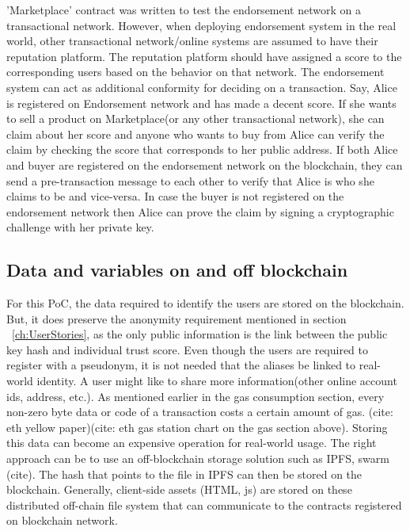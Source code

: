 'Marketplace' contract was written to test the endorsement network on a
transactional network. However, when deploying endorsement system in the real
world, other transactional network/online systems are assumed to have their
reputation platform. The reputation platform should have assigned a score to
the corresponding users based on the behavior on that network. The endorsement
system can act as additional conformity for deciding on a transaction. Say,
Alice is registered on Endorsement network and has made a decent score. If she
wants to sell a product on Marketplace(or any other transactional network), she
can claim about her score and anyone who wants to buy from Alice can verify the
claim by checking the score that corresponds to her public address. If both
Alice and buyer are registered on the endorsement network on the blockchain,
they can send a pre-transaction message to each other to verify that Alice is
who she claims to be and vice-versa. In case the buyer is not registered on the
endorsement network then Alice can prove the claim by signing a cryptographic
challenge with her private key. 

\subsection{Data and variables on and off blockchain}
For this PoC, the data required to identify the users are stored on the
blockchain. But, it does preserve the anonymity requirement mentioned in
section ~\ref{ch:UserStories}, as the only public information is the link between the public
key hash and individual trust score. Even though the users are required to
register with a pseudonym, it is not needed that the aliases be linked to
real-world identity. A user might like to share more information(other online
account ids, address, etc.).  As mentioned earlier in the gas consumption
section, every non-zero byte data or code of a transaction costs a certain
amount of gas. (cite: eth yellow paper)(cite: eth gas station chart on the gas
section above). Storing this data can become an expensive operation for
real-world usage. The right approach can be to use an off-blockchain storage
solution such as IPFS, swarm (cite). The hash that points to the file in IPFS
can then be stored on the blockchain. Generally, client-side assets (HTML, js)
are stored on these distributed off-chain file system that can communicate to
the contracts registered on blockchain network. 


